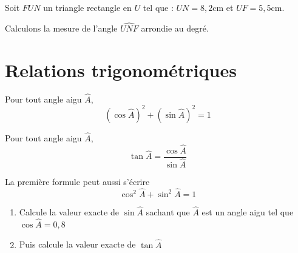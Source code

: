 \documentclass[a4paper,10pt]{report}
\begin{document}
\begin{meth}

Soit $FUN$ un triangle rectangle en $U$ tel que : $UN=8,2$cm et $UF=5,5$cm.

\medskip
\noindent Calculons la mesure de l'angle $\widehat{UNF}$ arrondie au degré.

\noindent\grandscarreaux{\linewidth}{4cm}
\end{meth}

\section{Relations trigonométriques}

\begin{prop}
Pour tout angle aigu $\widehat{A}$,
$$\left( \cos \widehat{A} \right)^2 + \left( \sin \widehat{A} \right)^2 = 1$$
\end{prop}

\begin{prop}
Pour tout angle aigu $\widehat{A}$,
$$\tan \widehat{A} = \dfrac{\cos \widehat{A}}{\sin \widehat{A}}$$
\end{prop}

\begin{rem}
La première formule peut aussi s'écrire $$\cos ^2 \widehat{A} + \sin ^2 \widehat{A} = 1$$
\end{rem}

\begin{ex}
\begin{enumerate}
\item Calcule la valeur exacte de $\sin \widehat{A}$ sachant que $\widehat{A}$ est un angle aigu tel que $\cos \widehat{A} = 0,8$

\noindent\grandscarreaux{\linewidth}{4cm}
\item Puis calcule la valeur exacte de $\tan \widehat{A}$

\noindent\grandscarreaux{\linewidth}{4cm}
\end{enumerate}
\end{ex}
\end{document}
